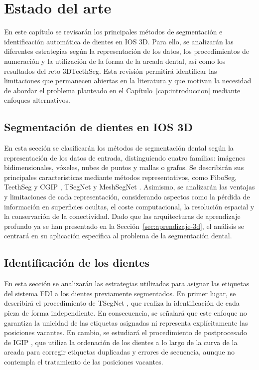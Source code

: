 \chapter{Estado del arte}
\label{cap:estado-arte}

En este capítulo se revisarán los principales métodos de segmentación e identificación automática de dientes en IOS 3D. Para ello, se analizarán las diferentes estrategias según la representación de los datos, los procedimientos de numeración y la utilización de la forma de la arcada dental, así como los resultados del reto 3DTeethSeg. Esta revisión permitirá identificar las limitaciones que permanecen abiertas en la literatura y que motivan la necesidad de abordar el problema planteado en el Capítulo~\ref{cap:introduccion} mediante enfoques alternativos.

\section{Segmentación de dientes en IOS 3D}
\label{sec:ea-segmentacion}

En esta sección se clasificarán los métodos de segmentación dental según la representación de los datos de entrada, distinguiendo cuatro familias: imágenes bidimensionales, vóxeles, nubes de puntos y mallas o grafos. Se describirán sus principales características mediante métodos representativos, como FiboSeg, TeethSeg y CGIP \cite{ben-hamadou3DTeethSeg223DTeeth2023}, TSegNet \cite{cuiTSegNetEfficientAccurate2021} y MeshSegNet \cite{lianDeepMultiScaleMesh2020}. Asimismo, se analizarán las ventajas y limitaciones de cada representación, considerando aspectos como la pérdida de información en superficies ocultas, el coste computacional, la resolución espacial y la conservación de la conectividad. Dado que las arquitecturas de aprendizaje profundo ya se han presentado en la Sección~\ref{sec:aprendizaje-3d}, el análisis se centrará en su aplicación específica al problema de la segmentación dental.

\section{Identificación de los dientes}
\label{sec:ea-identificacion}

En esta sección se analizarán las estrategias utilizadas para asignar las etiquetas del sistema FDI a los dientes previamente segmentados. En primer lugar, se describirá el procedimiento de TSegNet \cite{cuiTSegNetEfficientAccurate2021}, que realiza la identificación de cada pieza de forma independiente. En consecuencia, se señalará que este enfoque no garantiza la unicidad de las etiquetas asignadas ni representa explícitamente las posiciones vacantes. En cambio, se estudiará el procedimiento de postprocesado de IGIP \cite{ben-hamadou3DTeethSeg223DTeeth2023}, que utiliza la ordenación de los dientes a lo largo de la curva de la arcada para corregir etiquetas duplicadas y errores de secuencia, aunque no contempla el tratamiento de las posiciones vacantes.

